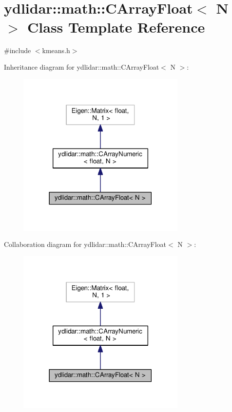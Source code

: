 \hypertarget{classydlidar_1_1math_1_1_c_array_float}{}\section{ydlidar\+:\+:math\+:\+:C\+Array\+Float$<$ N $>$ Class Template Reference}
\label{classydlidar_1_1math_1_1_c_array_float}


{\ttfamily \#include $<$kmeans.\+h$>$}



Inheritance diagram for ydlidar\+:\+:math\+:\+:C\+Array\+Float$<$ N $>$\+:\nopagebreak
\begin{figure}[H]
\begin{center}
\leavevmode
\includegraphics[width=237pt]{classydlidar_1_1math_1_1_c_array_float__inherit__graph}
\end{center}
\end{figure}


Collaboration diagram for ydlidar\+:\+:math\+:\+:C\+Array\+Float$<$ N $>$\+:\nopagebreak
\begin{figure}[H]
\begin{center}
\leavevmode
\includegraphics[width=237pt]{classydlidar_1_1math_1_1_c_array_float__coll__graph}
\end{center}
\end{figure}
